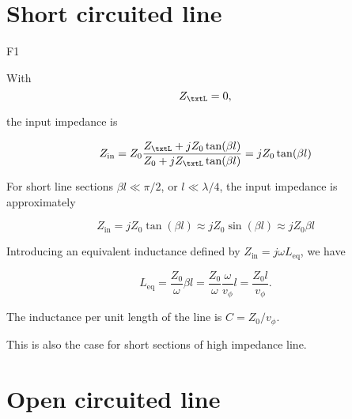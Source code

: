 %
%

\section{Short circuited line}

F1

With 
\begin{equation}\label{eqn:uwavesDeck5SmithChartCore:20}
Z_\txtL = 0,
\end{equation}

the input impedance is

\begin{equation}\label{eqn:uwavesDeck5SmithChartCore:40}
Z_{\textrm{in}} 
= Z_0 \frac{ Z_\txtL + j Z_0 \tan(\beta l) }{ Z_0 + j Z_\txtL \tan(\beta l)}
= j Z_0 \tan(\beta l)
\end{equation}

%
%

For short line sections \( \beta l \ll \pi/2 \), or \( l \ll \lambda/4 \), the input impedance is approximately

\begin{dmath}\label{eqn:uwavesDeck5SmithChartCore:80}
Z_{\textrm{in}} 
= j Z_0 \tan(\beta l)
\approx j Z_0 \sin(\beta l)
\approx j Z_0 \beta l
\end{dmath}

Introducing an equivalent inductance defined by \( Z_{\textrm{in}} = j \omega L_{\mathrm{eq}} \), we have

\begin{dmath}\label{eqn:uwavesDeck5SmithChartCore:100}
L_{\mathrm{eq}}
=
\frac{Z_0}{\omega} \beta l 
=
\frac{Z_0}{\omega} \frac{\omega}{v_\phi} l 
=
\frac{Z_0 l}{v_\phi}.
\end{dmath}

The inductance per unit length of the line is \( C = Z_0/v_\phi \).  

This is also the case for short sections of high impedance line.

\section{Open circuited line}

